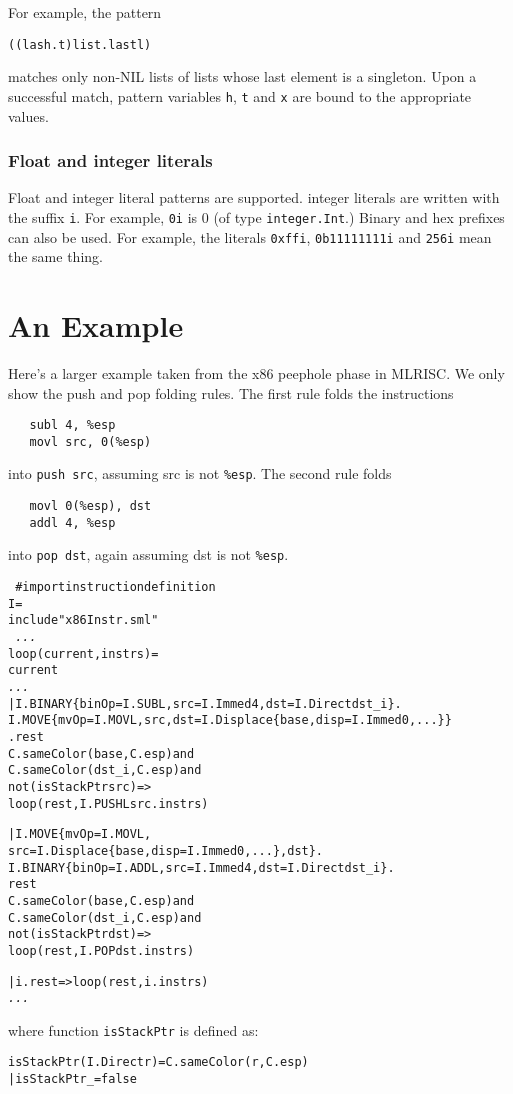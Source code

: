 For example, the pattern
\begin{alltt}
  ((l as h . t) \WHERE list.last l \IN [x])
\end{alltt}   
matches only non-NIL lists of lists whose last element is a singleton.
Upon a successful match, pattern variables \verb|h|, 
\verb|t| and \verb|x| are bound to the appropriate values.

\subsubsection{Float and integer literals}
 Float and integer literal patterns are supported.
integer literals are written with the suffix \verb|i|.
For example, \verb|0i| is 0 (of type \verb|integer.Int|.)
Binary and hex prefixes can also be used.
For example, the literals \verb|0xffi|, \verb|0b11111111i|
and \verb|256i| mean the same thing.

\section{An Example}
Here's a larger example taken from the x86 peephole phase in MLRISC.
We only show the push and pop folding rules.  The first rule
folds the instructions 
\begin{verbatim}
   subl 4, %esp
   movl src, 0(%esp)
\end{verbatim}
into \verb|push src|, assuming src is not \verb|%esp|. 
The second rule folds
\begin{verbatim}
   movl 0(%esp), dst
   addl 4, %esp
\end{verbatim}
into \verb|pop dst|, again assuming dst is not \verb|%esp|.

\begin{alltt}
\LOCAL\ 
   #  import instruction definition 
   \PACKAGE I = 
   \STRUCT
      include "x86Instr.sml" 
   \END
\IN\ 
   {\sl ... }
   \FUN loop(current, instrs) =
       \CASE current \OF
         {\sl ... }
      | I.BINARY\{binOp=I.SUBL, src=I.Immed 4, dst=I.Direct dst_i\} . 
        I.MOVE\{mvOp=I.MOVL,src,dst=I.Displace\{base,disp=I.Immed 0, ...\}\}
        . rest 
           \WHERE C.sameColor(base, C.esp) and
                  C.sameColor(dst_i, C.esp) and
                  not(isStackPtr src) =>
           loop(rest, I.PUSHL src . instrs)
               
      | I.MOVE\{mvOp=I.MOVL, 
              src=I.Displace\{base, disp=I.Immed 0, ...\}, dst\} .
        I.BINARY\{binOp=I.ADDL, src=I.Immed 4, dst=I.Direct dst_i\} . 
        rest 
           \WHERE C.sameColor(base, C.esp) and
                 C.sameColor(dst_i,C.esp) and
                 not(isStackPtr dst) =>
           loop(rest, I.POP dst . instrs)

     | i . rest => loop(rest, i . instrs)
     {\sl ... }
\END
\end{alltt}
where function \verb|isStackPtr| is defined as:
\begin{alltt}
  \FUN isStackPtr(I.Direct r) = C.sameColor(r,C.esp)
     | isStackPtr _ = false
\end{alltt}

